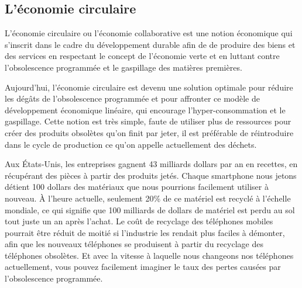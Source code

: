 \subsection{L'économie circulaire}


\smallbreak
L’économie circulaire ou l’économie collaborative est une notion économique qui s'inscrit dans le cadre du développement durable afin de de produire des biens et des services en respectant le concept de l'économie verte et en luttant contre l'obsolescence programmée et le gaspillage des matières premières.


\smallbreak
Aujourd'hui, l'économie circulaire est devenu une solution optimale pour réduire les dégâts de l'obsolescence programmée et pour affronter ce modèle de développement économique linéaire, qui encourage l’hyper-consommation et le gaspillage. Cette notion est très simple, faute de utiliser plus de ressources pour créer des produits obsolètes qu'on finit par jeter, il est préférable de réintroduire dans le cycle de production ce qu'on appelle actuellement des déchets.


\smallbreak
Aux États-Unis, les entreprises gagnent 43 milliards dollars par an en recettes, en récupérant des pièces à partir des produits jetés. Chaque smartphone nous jetons détient 100 dollars des matériaux que nous pourrions facilement utiliser à nouveau. À l'heure actuelle, seulement 20\% de ce matériel est recyclé à l'échelle mondiale, ce qui signifie que 100 milliards de dollars de matériel est perdu au sol tout juste un an après l'achat. Le coût de recyclage des téléphones mobiles pourrait être réduit de moitié si l'industrie les rendait plus faciles à démonter, afin que les nouveaux téléphones se produisent à partir du recyclage des téléphones obsolètes. Et avec la vitesse à laquelle nous changeons nos téléphones actuellement, vous pouvez facilement imaginer le taux des pertes causées par l'obsolescence programmée.



